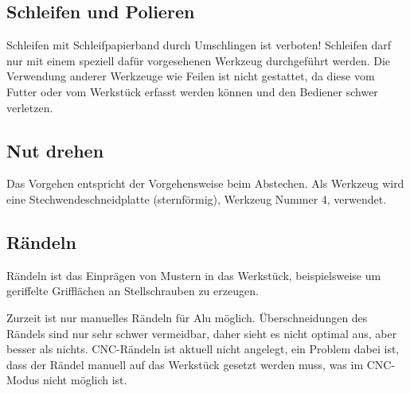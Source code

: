 \documentclass{\basedir/fablab-document}
\begin{document}
\subsection{Schleifen und Polieren}
Schleifen mit Schleifpapierband durch Umschlingen ist verboten!
Schleifen darf nur mit einem speziell dafür vorgesehenen Werkzeug durchgeführt werden. Die Verwendung anderer Werkzeuge wie Feilen ist nicht gestattet, da diese vom Futter oder vom Werkstück erfasst werden können und den Bediener schwer verletzen.

\subsection{Nut drehen}

Das Vorgehen entspricht der Vorgehensweise beim Abstechen.
Als Werkzeug wird eine Stechwendeschneidplatte (sternförmig), Werkzeug Nummer 4, verwendet.


\subsection{Rändeln}
\label{handdrehen:raendeln}

Rändeln ist das Einprägen von Mustern in das Werkstück, beispielsweise um geriffelte Grifflächen an Stellschrauben zu erzeugen.

Zurzeit ist nur manuelles Rändeln für Alu möglich. Überschneidungen des Rändels sind nur sehr schwer vermeidbar, daher sieht es nicht optimal aus, aber besser als nichts. CNC-Rändeln ist aktuell nicht angelegt, ein Problem dabei ist, dass der Rändel manuell auf das Werkstück gesetzt werden muss, was im CNC-Modus nicht möglich ist.
\end{document}
